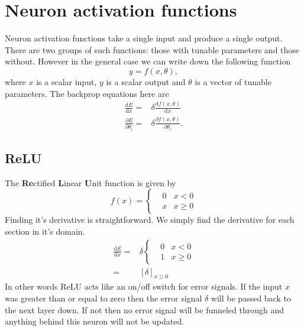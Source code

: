 \documentclass[a4paper]{article}
\begin{document}
\newpage
\section{Neuron activation functions}
Neuron activation functions take a single input and produce a single output. There are two groups of such functions: those with tunable parameters and those without. However in the general case we can write down the following function
\begin{equation}
y = f(x,\theta),
\end{equation}
where $x$ is a scalar input, $y$ is a scalar output and $\theta$ is a vector of tunable parameters. The backprop equations here are 
\begin{align}
\frac{\mathrm{d} E }{\mathrm{d} x} = & \delta \frac{\mathrm{d} f(x,\theta)}{\mathrm{d} x}\\
\frac{\partial E }{\partial \theta_i} = & \delta \frac{\partial f(x,\theta)}{\partial \theta_i}.
\end{align}

\subsection{ReLU}
The {\bf Re}ctified {\bf L}inear {\bf U}nit function is given by
\begin{equation}
f(x)=\left\{\begin{matrix}
 & 0 & x< 0\\ 
 & x & x \geq 0
\end{matrix}\right.
\end{equation}
Finding it's derivative is straightforward. We simply find the derivative for each section in it's domain.
\begin{align}
\frac{\mathrm{d} E }{\mathrm{d} x}= &
\delta \left\{\begin{matrix}
 & 0 & x< 0\\ 
 & 1 & x \geq 0
\end{matrix}\right. \\
= & \left [ \delta \right ]_{x \geq 0}
\end{align}
In other words ReLU acts like an on/off switch for error signals. If the input $x$ was greater than or equal to zero then the error signal $\delta$ will be passed back to the next layer down. If not then no error signal will be funneled through and anything behind this neuron will not be updated. 
\end{document}
